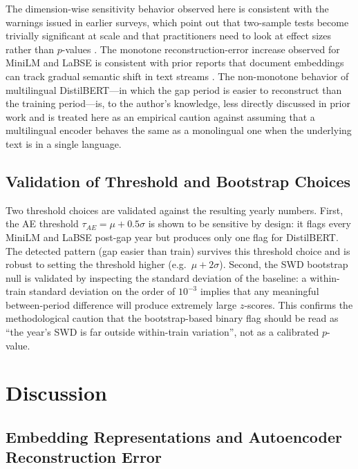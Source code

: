 \documentclass[conference]{IEEEtran}
\begin{document}
The dimension-wise sensitivity behavior observed here is consistent with the warnings issued in earlier surveys, which point out that two-sample tests become trivially significant at scale and that practitioners need to look at effect sizes rather than $p$-values \cite{lu2018,bayram2022}. The monotone reconstruction-error increase observed for MiniLM and LaBSE is consistent with prior reports that document embeddings can track gradual semantic shift in text streams \cite{hidalgo2019}. The non-monotone behavior of multilingual DistilBERT---in which the gap period is easier to reconstruct than the training period---is, to the author's knowledge, less directly discussed in prior work and is treated here as an empirical caution against assuming that a multilingual encoder behaves the same as a monolingual one when the underlying text is in a single language.

\subsection{Validation of Threshold and Bootstrap Choices}

Two threshold choices are validated against the resulting yearly numbers. First, the AE threshold $\tau_{AE} = \mu + 0.5\sigma$ is shown to be sensitive by design: it flags every MiniLM and LaBSE post-gap year but produces only one flag for DistilBERT. The detected pattern (gap easier than train) survives this threshold choice and is robust to setting the threshold higher (e.g.\ $\mu + 2\sigma$). Second, the SWD bootstrap null is validated by inspecting the standard deviation of the baseline: a within-train standard deviation on the order of $10^{-3}$ implies that any meaningful between-period difference will produce extremely large $z$-scores. This confirms the methodological caution that the bootstrap-based binary flag should be read as ``the year's SWD is far outside within-train variation'', not as a calibrated $p$-value.

\section{Discussion}
\label{sec:discussion}

\subsection{Embedding Representations and Autoencoder Reconstruction Error}
\end{document}
